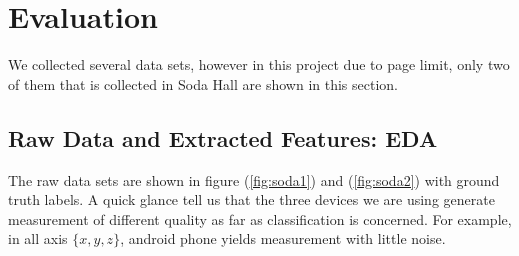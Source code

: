 
\section{Evaluation}

We collected several data sets, however in this project due to page limit, only two of them that is collected in Soda Hall are shown in this section.

\label{sec:evaluation}

\subsection{Raw Data and Extracted Features: EDA}

The raw data sets are shown in figure (\ref{fig:soda1}) and (\ref{fig:soda2}) with ground truth labels. A quick glance tell us that the three devices we are using generate measurement of different quality as far as classification is concerned. For example, in all axis $\{x,y,z\}$, android phone yields measurement with little noise. 

